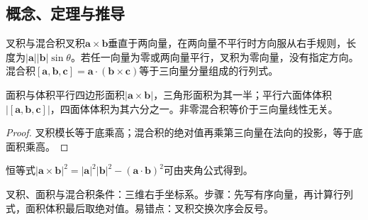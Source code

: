 \subsection{概念、定理与推导}

\begin{definition}{叉积与混合积}叉积$\bm a\times\bm b$垂直于两向量，在两向量不平行时方向服从右手规则，长度为$|\bm a||\bm b|\sin\theta$。若任一向量为零或两向量平行，叉积为零向量，没有指定方向。混合积$[\bm a,\bm b,\bm c]=\bm a\cdot(\bm b\times\bm c)$等于三向量分量组成的行列式。\end{definition}
\begin{theorem}{面积与体积}平行四边形面积$|\bm a\times\bm b|$，三角形面积为其一半；平行六面体体积$|[\bm a,\bm b,\bm c]|$，四面体体积为其六分之一。非零混合积等价于三向量线性无关。\end{theorem}
\begin{proof}叉积模长等于底乘高；混合积的绝对值再乘第三向量在法向的投影，等于底面积乘高。\end{proof}
恒等式$|\bm a\times\bm b|^2=|\bm a|^2|\bm b|^2-(\bm a\cdot\bm b)^2$可由夹角公式得到。

\begin{method}{叉积、面积与混合积}条件：三维右手坐标系。步骤：先写有序向量，再计算行列式，面积体积最后取绝对值。易错点：叉积交换次序会反号。\end{method}
